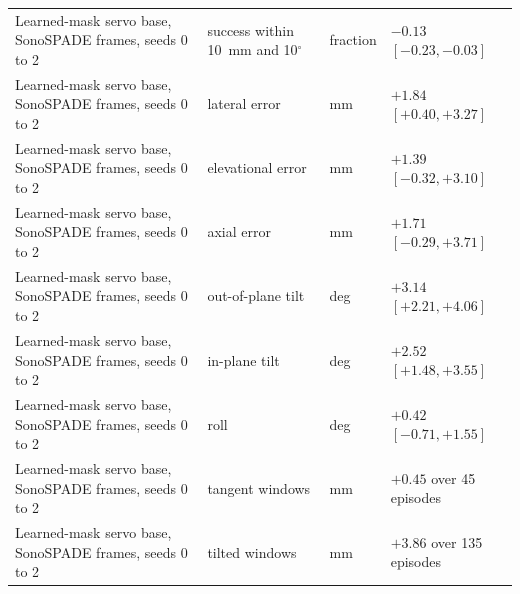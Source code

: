 \begin{table}[tp]
\begin{tabularx}{\textwidth}{@{}l >{\raggedright\arraybackslash}X l l@{}}
Learned-mask servo base, SonoSPADE frames, seeds 0 to 2 & success within 10~mm and 10$^\circ$ & fraction & $-0.13$ $[-0.23, -0.03]$ \\
Learned-mask servo base, SonoSPADE frames, seeds 0 to 2 & lateral error & mm & $+1.84$ $[+0.40, +3.27]$ \\
Learned-mask servo base, SonoSPADE frames, seeds 0 to 2 & elevational error & mm & $+1.39$ $[-0.32, +3.10]$ \\
Learned-mask servo base, SonoSPADE frames, seeds 0 to 2 & axial error & mm & $+1.71$ $[-0.29, +3.71]$ \\
Learned-mask servo base, SonoSPADE frames, seeds 0 to 2 & out-of-plane tilt & deg & $+3.14$ $[+2.21, +4.06]$ \\
Learned-mask servo base, SonoSPADE frames, seeds 0 to 2 & in-plane tilt & deg & $+2.52$ $[+1.48, +3.55]$ \\
Learned-mask servo base, SonoSPADE frames, seeds 0 to 2 & roll & deg & $+0.42$ $[-0.71, +1.55]$ \\
Learned-mask servo base, SonoSPADE frames, seeds 0 to 2 & tangent windows & mm & $+0.45$ over 45 episodes \\
Learned-mask servo base, SonoSPADE frames, seeds 0 to 2 & tilted windows & mm & $+3.86$ over 135 episodes \\
\bottomrule
\end{tabularx}
\end{table}
